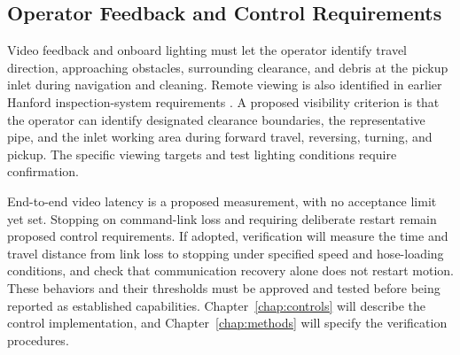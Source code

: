 \subsection{Operator Feedback and Control Requirements}
\label{sec:operator-requirements}
Video feedback and onboard lighting must let the operator identify travel direction, approaching obstacles, surrounding clearance, and debris at the pickup inlet during navigation and cleaning. Remote viewing is also identified in earlier Hanford inspection-system requirements \citep{pardini2001DSTRequirements}. A proposed visibility criterion is that the operator can identify designated clearance boundaries, the representative pipe, and the inlet working area during forward travel, reversing, turning, and pickup. The specific viewing targets and test lighting conditions require confirmation.

End-to-end video latency is a proposed measurement, with no acceptance limit yet set. Stopping on command-link loss and requiring deliberate restart remain proposed control requirements. If adopted, verification will measure the time and travel distance from link loss to stopping under specified speed and hose-loading conditions, and check that communication recovery alone does not restart motion. These behaviors and their thresholds must be approved and tested before being reported as established capabilities. Chapter~\ref{chap:controls} will describe the control implementation, and Chapter~\ref{chap:methods} will specify the verification procedures.
\par



